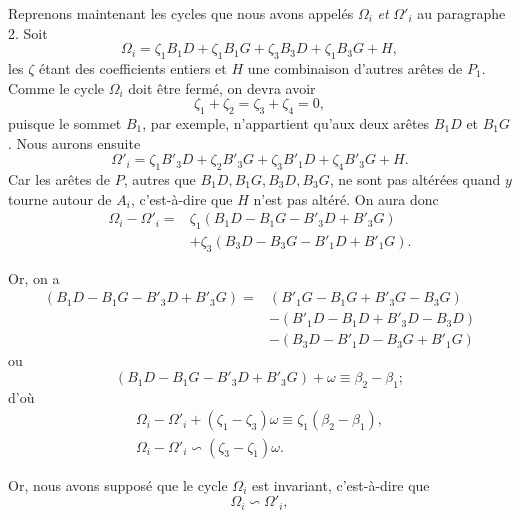 \documentclass{article}
\begin{document}
Reprenons maintenant les cycles que nous avons appelés $\Omega_{i}$ \emph{et} $\Omega'_{i}$ au paragraphe 2. Soit
\[ \Omega_{i} = \zeta_{1} B_{1}D + \zeta_{1} B_{1}G + \zeta_{3} B_{3}D + \zeta_{1} B_{3}G + H, \]
les $\zeta$ étant des coefficients entiers et $H$ une combinaison d'autres arêtes de $P_{1}$. Comme le cycle $\Omega_{i}$ doit être fermé, on devra avoir
\[ \zeta_{1} + \zeta_{2} = \zeta_{3} + \zeta_{4} = 0, \]
puisque le sommet $B_{1}$, par exemple, n'appartient qu'aux deux arêtes $B_{1}D$ et $B_{1}G$. Nous aurons ensuite
\[ \Omega'_{i} = \zeta_{1} B'_{3}D + \zeta_{2} B'_{3}G + \zeta_{3} B'_{1}D + \zeta_{4} B'_{3}G + H. \]
Car les arêtes de $P$, autres que $B_{1}D, B_{1}G, B_{3}D, B_{3}G$, ne sont pas altérées quand $y$ tourne autour de $A_{i}$, c'est-à-dire que $H$ n'est pas altéré. On aura donc
\[ \begin{aligned} \Omega_{i} - \Omega'_{i} = {}&\zeta_{1}(B_{1}D - B_{1}G - B'_{3}D + B'_{3}G)\\ &+ \zeta_{3}(B_{3}D - B_{3}G - B'_{1}D + B'_{1}G). \end{aligned} \]

Or, on a
\[ \begin{aligned} (B_{1}D - B_{1}G - B'_{3}D + B'_{3}G) = {}&(B'_{1}G - B_{1}G + B'_{3}G - B_{3}G)\\ &- (B'_{1}D - B_{1}D + B'_{3}D - B_{3}D)\\ &- (B_{3}D - B'_{1}D - B_{3}G + B'_{1}G) \end{aligned} \]
ou
\[ (B_{1}D - B_{1}G - B'_{3}D + B'_{3}G) + \omega \equiv \beta_{2} - \beta_{1}; \]
d'où
\[ \begin{gathered} \Omega_{i} - \Omega'_{i} + (\zeta_{1} - \zeta_{3})\omega \equiv \zeta_{1}(\beta_{2} - \beta_{1}),\\ \Omega_{i} - \Omega'_{i} \backsim (\zeta_{3} - \zeta_{1})\omega. \end{gathered} \]

Or, nous avons supposé que le cycle $\Omega_{i}$ est invariant, c'est-à-dire que
\[ \Omega_{i} \backsim \Omega'_{i}, \]
\end{document}
